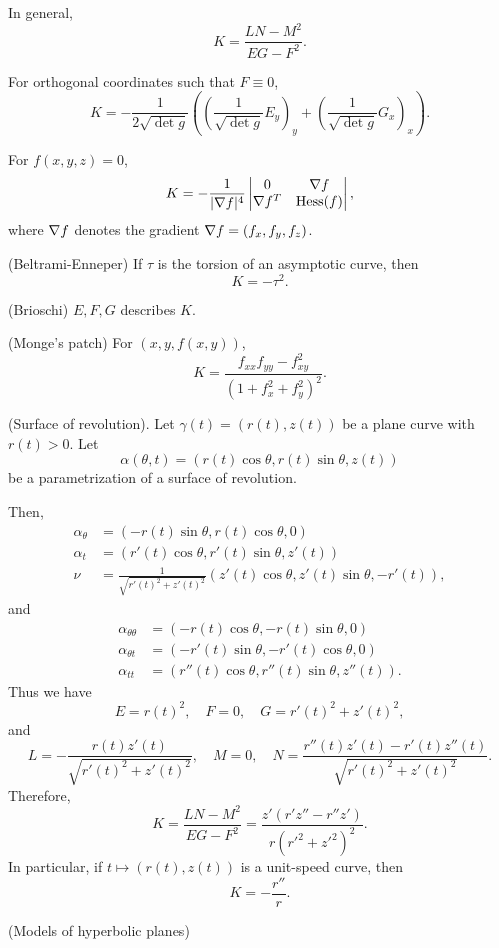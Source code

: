 \documentclass{../exp}
\def\a{\alpha}
\begin{document}
\begin{thm}
$ $\\[-10pt]
\begin{cond}
\item
In general,
\[K=\frac{LN-M^2}{EG-F^2}.\]
\item
For orthogonal coordinates such that $F\equiv0$,
\[K=-\frac1{2\sqrt{\det g}}\left((\frac1{\sqrt{\det g}}E_y)_y+(\frac1{\sqrt{\det g}}G_x)_x\right).\]
\item
For $f(x,y,z)=0$,
\[K=-\frac1{|\del f|^4}\mat[v]{0&\del f\\\del f^T&\Hess(f)},\]
where $\del f$ denotes the gradient $\del f=(f_x,f_y,f_z)$.
\item(Beltrami-Enneper) If $\tau$ is the torsion of an asymptotic curve, then
\[K=-\tau^2.\]
\item(Brioschi) $E,F,G$ describes $K$.
\end{cond}
\end{thm}


\begin{exs}
\item
(Monge's patch)
For $(x,y,f(x,y))$,
\[K=\frac{f_{xx}f_{yy}-f_{xy}^2}{(1+f_x^2+f_y^2)^2}.\]
\item
(Surface of revolution).
Let $\gamma(t)=(r(t),z(t))$ be a plane curve with $r(t)>0$.
Let
\[\a(\theta,t)=(r(t)\cos\theta,r(t)\sin\theta,z(t))\]
be a parametrization of a surface of revolution.

Then,
\begin{align*}
\a_\theta&=(-r(t)\sin\theta,r(t)\cos\theta,0)\\
\a_t&=(r'(t)\cos\theta,r'(t)\sin\theta,z'(t))\\
\nu&=\frac1{\sqrt{r'(t)^2+z'(t)^2}}(z'(t)\cos\theta,z'(t)\sin\theta,-r'(t)),
\end{align*}
and
\begin{align*}
\a_{\theta\theta}&=(-r(t)\cos\theta,-r(t)\sin\theta,0)\\
\a_{\theta t}&=(-r'(t)\sin\theta,-r'(t)\cos\theta,0)\\
\a_{tt}&=(r''(t)\cos\theta,r''(t)\sin\theta,z''(t)).
\end{align*}
Thus we have
\[E=r(t)^2,\quad F=0,\quad G=r'(t)^2+z'(t)^2,\]
and
\[L=-\frac{r(t)z'(t)}{\sqrt{r'(t)^2+z'(t)^2}},\quad M=0,\quad N=\frac{r''(t)z'(t)-r'(t)z''(t)}{\sqrt{r'(t)^2+z'(t)^2}}.\]
Therefore,
\[K=\frac{LN-M^2}{EG-F^2}=\frac{z'(r'z''-r''z')}{r(r'^2+z'^2)^2}.\]
In particular, if $t\mapsto(r(t),z(t))$ is a unit-speed curve, then
\[K=-\frac{r''}r.\]

\item
(Models of hyperbolic planes)
\end{exs}
\end{document}
